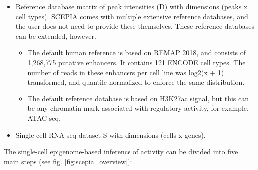 \begin{itemize}
	\item Reference database matrix of peak intensities (D) with dimensions (peaks x cell types). SCEPIA comes with multiple extensive reference databases, and the user does not need to provide these themselves. These reference databases can be extended, however.
    \begin{itemize}
        \item The default human reference is based on REMAP 2018\cite{Chneby2017}, and consists of 1,268,775 putative enhancers. It contains 121 ENCODE\cite{encode_dcc} cell types. The number of reads in these enhancers per cell line was log2(x + 1) transformed, and quantile normalized\cite{qnorm} to enforce the same distribution.
        \item The default reference database is based on H3K27ac signal, but this can be any chromatin mark associated with regulatory activity, for example, ATAC-seq.
    \end{itemize}
	\item Single-cell RNA-seq dataset S with dimensions (cells x genes). 
\end{itemize}

\noindent
The single-cell epigenome-based inference of activity can be divided into five main steps (see fig. \ref{fig:scepia_overview}):

